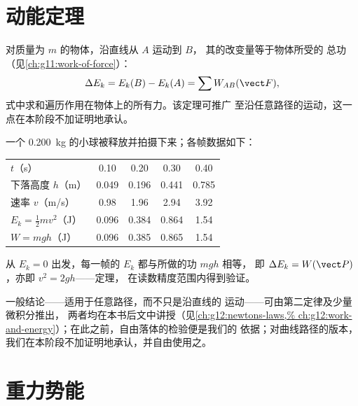 \section{动能定理}

\begin{theorem}[动能定理]\label{thm:g11:mechanical-energy:ketheorem}
对质量为 $m$ 的物体，沿直线从 $A$ 运动到 $B$，
其的改变量等于物体所受的
总功（见\cref{ch:g11:work-of-force}）：
\[
\Delta E_k = E_k(B) - E_k(A) = \sum W_{AB}(\vect F),
\]
式中求和遍历作用在物体上的所有力。该定理可推广
至沿任意路径的运动，这一点在本阶段不加证明地承认。
\end{theorem}
\admitted

\begin{example}\label{ex:g11:mechanical-energy:freefall}
一个 \qty{0.200}{kg} 的小球被释放并拍摄下来；各帧数据如下：
\begin{center}\small
\begin{tabular}{lcccc}
$t$（\unit{s}）& 0.10 & 0.20 & 0.30 & 0.40\\
下落高度 $h$（\unit{m}）& 0.049 & 0.196 & 0.441 & 0.785\\
速率 $v$（\unit{m/s}）& 0.98 & 1.96 & 2.94 & 3.92\\
$E_k = \tfrac12 mv^2$（\unit{J}）& 0.096 & 0.384 & 0.864 & 1.54\\
$W = mgh$（\unit{J}）& 0.096 & 0.385 & 0.865 & 1.54
\end{tabular}
\end{center}
从 $E_k = 0$ 出发，每一帧的 $E_k$ 都与所做的功 $mgh$ 相等，
即 $\Delta E_k = W(\vect P)$，亦即 $v^2 = 2gh$——定理，
在读数精度范围内得到验证。
\end{example}

\begin{remark}[证明的出处]\label{rem:g11:mechanical-energy:proof}
一般结论——适用于任意路径，而不只是沿直线的
运动——可由第二定律及少量微积分推出，
两者均在本书后文中讲授（见\cref{ch:g12:newtons-laws,%
ch:g12:work-and-energy}）；在此之前，自由落体的检验便是我们的
依据；对曲线路径的版本，我们在本阶段不加证明地承认，并自由使用之。
\end{remark}

\section{重力势能}

